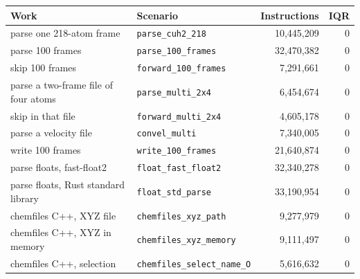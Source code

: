 \begin{tabular}{@{}llrr@{}}
\toprule
Work & Scenario & Instructions & IQR\\
\midrule
parse one 218-atom frame & \texttt{parse\_cuh2\_218} & 10{,}445{,}209 & 0\\
parse 100 frames & \texttt{parse\_100\_frames} & 32{,}470{,}382 & 0\\
skip 100 frames & \texttt{forward\_100\_frames} & 7{,}291{,}661 & 0\\
parse a two-frame file of four atoms & \texttt{parse\_multi\_2x4} & 6{,}454{,}674 & 0\\
skip in that file & \texttt{forward\_multi\_2x4} & 4{,}605{,}178 & 0\\
parse a velocity file & \texttt{convel\_multi} & 7{,}340{,}005 & 0\\
write 100 frames & \texttt{write\_100\_frames} & 21{,}640{,}874 & 0\\
parse floats, fast-float2 & \texttt{float\_fast\_float2} & 32{,}340{,}278 & 0\\
parse floats, Rust standard library & \texttt{float\_std\_parse} & 33{,}190{,}954 & 0\\
chemfiles C++, XYZ file & \texttt{chemfiles\_xyz\_path} & 9{,}277{,}979 & 0\\
chemfiles C++, XYZ in memory & \texttt{chemfiles\_xyz\_memory} & 9{,}111{,}497 & 0\\
chemfiles C++, selection & \texttt{chemfiles\_select\_name\_O} & 5{,}616{,}632 & 0\\
\bottomrule
\end{tabular}
